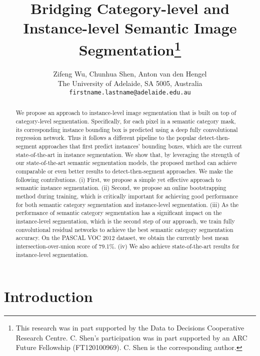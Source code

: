 \documentclass{article}
\title{
    Bridging Category-level and Instance-level Semantic Image Segmentation\thanks{This
    research was in part supported by the Data to Decisions
    Cooperative Research Centre.
    C. Shen's participation was in part
    supported by an ARC Future Fellowship (FT120100969).
    C. Shen is the corresponding author.
  }
 }
\author{
  Zifeng Wu, Chunhua Shen, Anton van den Hengel\\
The University of Adelaide,
  SA 5005, Australia\\
  \texttt{firstname.lastname@adelaide.edu.au}\\
}
\begin{document}
\maketitle




\begin{abstract}

We propose an approach to instance-level image segmentation  that is built on top of  category-level segmentation.
    Specifically,
    for each pixel in a semantic category mask,  its corresponding instance bounding box is predicted
    using a deep fully convolutional regression network.
Thus it follows a different pipeline to the popular detect-then-segment approaches that first predict instances' bounding boxes,
which are the current state-of-the-art in instance segmentation.
We show that, by leveraging the strength of our state-of-the-art semantic segmentation models,
the proposed method can achieve comparable or even better results to detect-then-segment approaches.
We make the following contributions.
(i) First, we propose a simple yet effective approach to semantic instance segmentation.
(ii) Second, we propose an online bootstrapping method during  training,
which is critically important for achieving good performance for both semantic category segmentation  and instance-level segmentation.
(iii) As the performance of semantic category segmentation has a significant impact on
    the instance-level segmentation,
    which is the second step of our approach,
    we train fully convolutional residual networks to achieve the best semantic category segmentation accuracy.
    On the PASCAL VOC 2012 dataset, we obtain the currently best mean intersection-over-union score of 79.1\%.
(iv) We also achieve state-of-the-art results for instance-level segmentation.






\end{abstract}





\section{Introduction}
\end{document}
